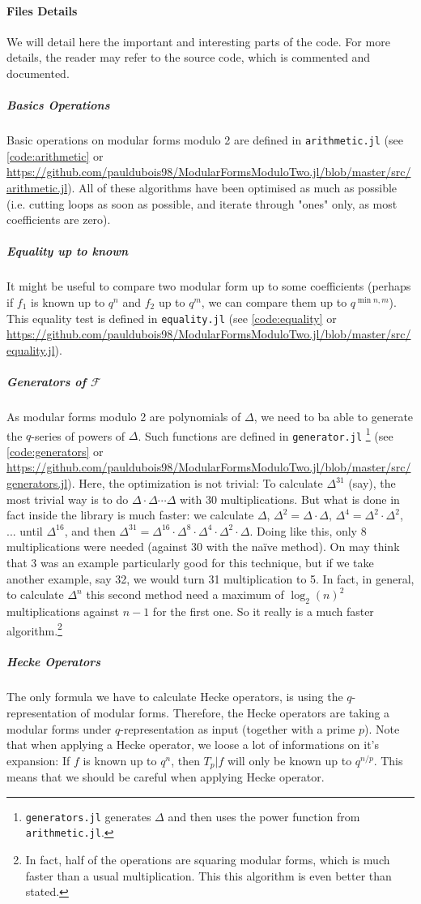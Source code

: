 \paragraph{Files Details}
We will detail here the important and interesting parts of the code.
For more details, the reader may refer to the source code, which is commented and documented.
\subparagraph{Basics Operations}
Basic operations on modular forms modulo 2 are defined in \texttt{arithmetic.jl} (see \ref{code:arithmetic} or \url{https://github.com/pauldubois98/ModularFormsModuloTwo.jl/blob/master/src/arithmetic.jl}).
All of these algorithms have been optimised as much as possible (i.e. cutting loops as soon as possible, and iterate through "ones" only, as most coefficients are zero).
\subparagraph{Equality up to known}
It might be useful to compare two modular form up to some coefficients (perhaps if $f_1$ is known up to $q^n$ and $f_2$ up to $q^m$, we can compare them up to $q^{\min{n,m}}$).
This equality test is defined in \texttt{equality.jl} (see \ref{code:equality} or \url{https://github.com/pauldubois98/ModularFormsModuloTwo.jl/blob/master/src/equality.jl}).
\subparagraph{Generators of $\mathcal{F}$}
As modular forms modulo 2 are polynomials of $\Delta$, we need to ba able to generate the $q$-series of powers of $\Delta$.
Such functions are defined in \texttt{generator.jl} \footnote{\texttt{generators.jl} generates $\Delta$ and then uses the power function from \texttt{arithmetic.jl}.} (see \ref{code:generators} or \url{https://github.com/pauldubois98/ModularFormsModuloTwo.jl/blob/master/src/generators.jl}).
Here, the optimization is not trivial:
To calculate $\Delta^{31}$ (say), the most trivial way is to do $\Delta \cdot \Delta \cdots \Delta$ with 30 multiplications.
But what is done in fact inside the library is much faster: we calculate $\Delta$, $\Delta^2 = \Delta \cdot \Delta$, $\Delta^4 = \Delta^2 \cdot \Delta^2$, ... until $\Delta^{16}$, and then $\Delta^{31} = \Delta^{16} \cdot \Delta^8 \cdot \Delta^4 \cdot \Delta^2 \cdot \Delta$.
Doing like this, only 8 multiplications were needed (against 30 with the naïve method).
On may think that 3 was an example particularly good for this technique, but if we take another example, say 32, we would turn 31 multiplication to 5.
In fact, in general, to calculate $\Delta^n$ this second method need a maximum of $\log_2(n)^2$ multiplications against $n-1$ for the first one.
So it really is a much faster algorithm.\footnote{In fact, half of the operations are squaring modular forms, which is much faster than a usual multiplication. This this algorithm is even better than stated.}
\subparagraph{Hecke Operators}
The only formula we have to calculate Hecke operators, is using the $q$-representation of modular forms.
Therefore, the Hecke operators are taking a modular forms under $q$-representation as input (together with a prime $p$).
Note that when applying a Hecke operator, we loose a lot of informations on it's expansion:
If $f$ is known up to $q^n$, then $T_p|f$ will only be known up to $q^{n/p}$.
This means that we should be careful when applying Hecke operator.

